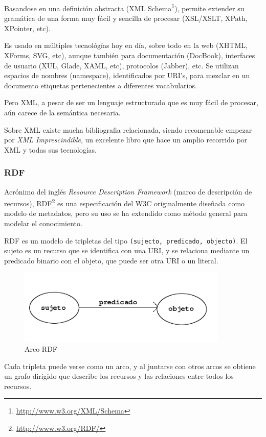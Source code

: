 Basandose en una definición abstracta (XML Schema\footnote{\url{http://www.w3.org/XML/Schema}}), 
permite extender su gramática de una forma muy fácil y sencilla de procesar 
(XSL/XSLT, XPath, XPointer, etc).

Es usado en múltiples tecnológías hoy en día, sobre todo en la web (XHTML, XForms, 
SVG, etc), aunque también para documentación (DocBook), interfaces de usuario (XUL,
Glade, XAML, etc), protocolos (Jabber), etc. Se utilizan espacios de nombres (namespace), 
identificados por URI's, para mezclar en un documento etiquetas pertenecientes a 
diferentes vocabularios.

Pero XML, a pesar de ser un lenguaje estructurado que es muy fácil de procesar, 
aún carece de la semántica necesaria. 

Sobre XML existe mucha bibliografia relacionada, siendo recomenable empezar por
\emph{XML Imprescindible}\cite{XMLNutshell}, un excelente libro que hace un amplio
recorrido por XML y todas sus tecnologías.

\subsubsection{RDF}

Acrónimo del inglés \emph{Resource Description Framework} (marco de descripción 
de recursos), RDF\footnote{\url{http://www.w3.org/RDF/}} es una especificación del 
W3C originalmente diseñada como modelo de metadatos, pero su uso se ha extendido como
método general para modelar el conocimiento.

RDF es un modelo de tripletas del tipo \texttt{(sujecto, predicado, objecto)}. El
sujeto es un recurso que se identifica con una URI, y se relaciona mediante un 
predicado binario con el objeto, que puede ser otra URI o un literal.

\begin{figure}[H]
	\centering
	\includegraphics[width=10cm]{images/arc.png}
	\caption{Arco RDF}
	\label{fig:rdfTriplet}
\end{figure}

Cada tripleta puede verse como un arco, y al juntarse con otros arcos se obtiene
un grafo dirigido que describe los recursos y las relaciones entre todos los 
recursos.

